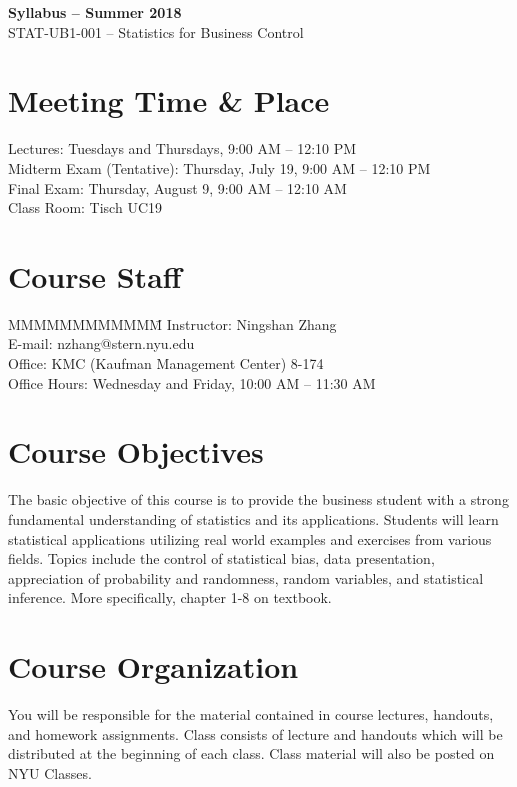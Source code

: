 \documentclass[11pt]{article}
\begin{document}
\begin{center}
  \large
  \textbf{Syllabus -- Summer 2018} \\
  
STAT-UB1-001 -- Statistics for Business Control \\
\end{center}


\section*{Meeting Time \& Place}
Lectures: Tuesdays and Thursdays, 9:00 AM -- 12:10 PM \\
Midterm Exam (Tentative): Thursday, July 19, 9:00 AM -- 12:10 PM \\
Final Exam: Thursday, August 9, 9:00 AM -- 12:10 AM \\
Class Room: Tisch UC19


\section*{Course Staff}

\begin{tabbing}
  MMMMMMMMMMMM\= \kill
  Instructor:   \> Ningshan Zhang \\
  E-mail:       \> nzhang@stern.nyu.edu \\
  Office:       \> KMC (Kaufman Management Center) 8-174 \\
  Office Hours: \> Wednesday and Friday, 10:00 AM -- 11:30 AM \\
\end{tabbing}

\section*{Course Objectives}

The basic objective of this course is to provide the business student with a
strong fundamental understanding of statistics and its applications. Students
will learn statistical applications utilizing real world examples and exercises 
from various fields. Topics include the control of statistical bias, data 
presentation, appreciation of probability and randomness, random variables, and
statistical inference. More specifically, chapter 1-8 on textbook.

\section*{Course Organization}
You will be responsible for the material contained in course lectures,
handouts, and homework assignments. Class consists of lecture and handouts
which will be distributed at the beginning of each class. Class material will 
also be posted on NYU Classes. 
\end{document}
